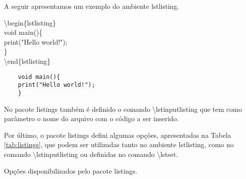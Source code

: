 A seguir apresentamos um exemplo do ambiente \textsf{lstlisting}.
\begin{minipage}[t]{0.47\linewidth}
    \textbackslash begin\{lstlisting\} \\
    void main()\{ \\
    print("Hello world!"); \\
    \} \\
    \textbackslash end\{lstlisting\}
\end{minipage} \hfill
\begin{minipage}[t]{0.47\linewidth}
    \begin{lstlisting}
    void main(){
    print("Hello world!");
    }
    \end{lstlisting}
\end{minipage}

No pacote \textsf{listings} também é definido o comando \textbackslash\textsf{lstinputlisting} que tem como parâmetro o nome do arquivo com o código a ser inserido.

Por último, o pacote \textsf{listings} defini algumas opções, apresentadas na Tabela \ref{tab:listings}, que podem ser utilizadas tanto no ambiente \textsf{lstlisting}, como no comando \textbackslash\textsf{lstinputlisting} ou definidas no comando \textbackslash\textsf{lstset}.

\begin{table}[h!tb]
    \centering
    \caption{Opções disponibilizados pelo pacote \textsf{listings}.}
    \label{tab:listings}
\end{table}
